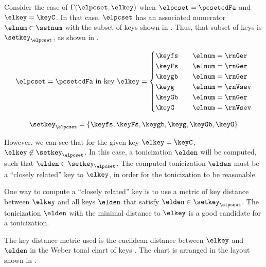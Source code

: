 
Consider the case of $\Gamma(\elpcset, \elkey)$ when
$\elpcset = \pcsetcdFa$ and $\elkey = \keyC$. In that case,
$\elpcset$ has an associated numerator $\elnum \in \setnum$
with the subset of keys shown in .
Thus, that subset of keys is $\setkey_\elpcset$, as shown in
. 

\begin{equation}
    \label{eq:key_not_found}
    \elpcset = \pcsetcdFa \text{ in key } \elkey =
    \begin{cases}
        \keyfs & \quad \elnum = \rnGer \\
        \keyFs & \quad \elnum = \rnGer \\
        \keygb & \quad \elnum = \rnGer \\
        \keyg  & \quad \elnum = \rnVsev \\
        \keyGb & \quad \elnum = \rnGer \\
        \keyG  & \quad \elnum = \rnVsev \\
    \end{cases}
\end{equation}

\begin{equation}
    \label{eq:key_not_found2}
    \setkey_\elpcset = \{ \keyfs, \keyFs, \keygb, \keyg, \keyGb, \keyG \}
\end{equation}

However, we can see that for the given key $\elkey = \keyC$,
$\elkey \not\in \setkey_\elpcset$. In this case, a
tonicization $\elden$ will be computed, such that $\elden
\in \setkey_\elpcset$. The computed tonicization $\elden$
must be a ``closely related'' key to $\elkey$, in order for
the tonicization to be reasonable.

One way to compute a ``closely related'' key is to use a
metric of key distance between $\elkey$ and all keys
$\elden$ that satisfy $\elden \in \setkey_\elpcset$. The
tonicization $\elden$ with the minimal distance to $\elkey$
is a good candidate for a tonicization.

The key distance metric used is the euclidean distance
between $\elkey$ and $\elden$ in the Weber tonal chart of
keys \parencite{weber1818versuch}. The chart is arranged in
the layout shown in .



